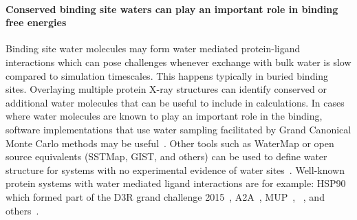 \documentclass[9pt,bestpractices,pubversion]{livecoms}
\begin{document}
\paragraph{Conserved binding site waters can play an important role in binding free energies}
Binding site water molecules may form water mediated protein-ligand interactions which can pose challenges whenever exchange with bulk water is slow compared to simulation timescales. This happens typically in buried binding sites. Overlaying multiple protein X-ray structures can identify conserved or additional water molecules that can be useful to include in calculations. In cases where water molecules are known to play an important role in the binding, software implementations that use water sampling facilitated by Grand Canonical Monte Carlo methods may be useful~\cite{michel2010prediction}. Other tools such as WaterMap or open source equivalents (SSTMap, GIST, and others) can be used to define water structure for systems with no experimental evidence of water sites~\cite{wang2011ligand}. Well-known protein systems with water mediated ligand interactions are for example: HSP90 which formed part of the D3R grand challenge 2015~\cite{mey2016blinded}, A2A~\cite{brucemacdonald2018ligand}, MUP~\cite{ross2015water}, ~\cite{deflorian2020accurate}, and others~\cite{michel2009energetics}.
\end{document}
